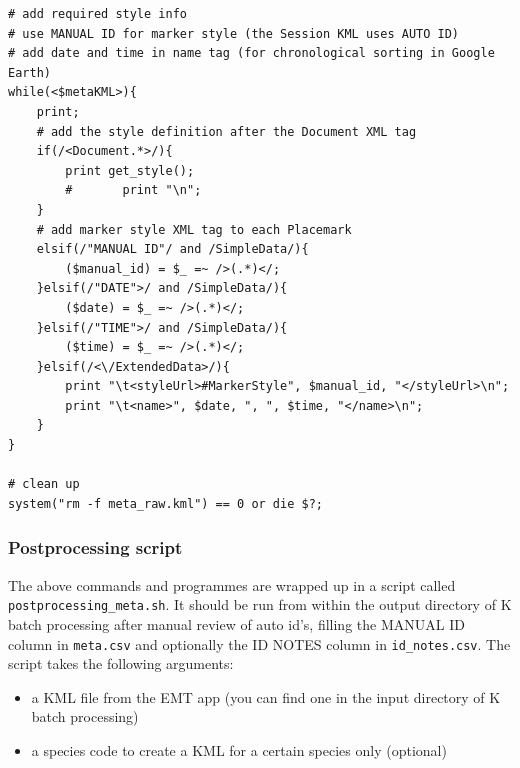 \documentclass[English, 11pt, twoside, authoryear]{article}
\begin{document}
\begin{lstlisting}
# add required style info
# use MANUAL ID for marker style (the Session KML uses AUTO ID)
# add date and time in name tag (for chronological sorting in Google Earth)
while(<$metaKML>){
    print;
    # add the style definition after the Document XML tag
    if(/<Document.*>/){
        print get_style();
        #       print "\n";
    }
    # add marker style XML tag to each Placemark
    elsif(/"MANUAL ID"/ and /SimpleData/){
        ($manual_id) = $_ =~ />(.*)</;
    }elsif(/"DATE">/ and /SimpleData/){
        ($date) = $_ =~ />(.*)</;
    }elsif(/"TIME">/ and /SimpleData/){
        ($time) = $_ =~ />(.*)</;
    }elsif(/<\/ExtendedData>/){
        print "\t<styleUrl>#MarkerStyle", $manual_id, "</styleUrl>\n";
        print "\t<name>", $date, ", ", $time, "</name>\n";
    }
}

# clean up
system("rm -f meta_raw.kml") == 0 or die $?;
\end{lstlisting}

%
%
\subsubsection{Postprocessing script}
%
%

The above commands and programmes are wrapped up in a script called \texttt{postprocessing\_meta.sh}.
It should be run from within the output directory of \textsf{K} batch processing after manual review of auto id's, filling the MANUAL ID column in \texttt{meta.csv} and optionally the ID NOTES column in \texttt{id\_notes.csv}. The script takes the following arguments:
\begin{itemize}
\item a KML file from the EMT app (you can find one in the input directory of \textsf{K} batch processing)
\item a species code to create a KML for a certain species only (optional)
\end{itemize}
\end{document}

